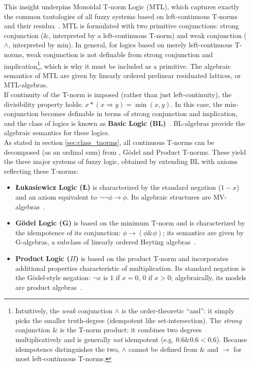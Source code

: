 This insight underpins Monoidal T-norm Logic (MTL), which captures exactly the common tautologies of all fuzzy systems based on left-continuous T-norms and their residua~\cite{GodoMonoidal}. MTL is formulated with two primitive conjunctions: strong conjunction ($\&$, interpreted by a left-continuous T-norm) and weak conjunction ($\wedge$, interpreted by min). In general, for logics based on merely left-continuous T-norms, weak conjunction is not definable from strong conjunction and implication\footnote{Intuitively, the \emph{weak} conjunction $\wedge$ is the order-theoretic ``and'': it simply picks the smaller truth-degree (idempotent like set-intersection). The \emph{strong} conjunction $\&$ is the T-norm product: it combines two degrees multiplicatively and is generally \emph{not} idempotent (e.g. $0.6\&0.6<0.6$). Because idempotence distinguishes the two, $\wedge$ cannot be defined from $\&$ and $\to$ for most left-continuous T-norms.}, which is why it must be included as a primitive. The algebraic semantics of MTL are given by linearly ordered prelinear residuated lattices, or MTL-algebras.\\

If continuity of the T-norm is imposed (rather than just left-continuity), the divisibility property holds: $x * (x \Rightarrow y) = \min(x, y)$. In this case, the min-conjunction becomes definable in terms of strong conjunction and implication, and the class of logics is known as \textbf{Basic Logic (BL)}~\cite[Sec. 2.2]{Hajek1998}. BL-algebras provide the algebraic semantics for these logics.\\ 

As stated in section \ref{sec:class_tnorms}, all continuous T-norms can be decomposed (as an ordinal sum) from \luka, Gödel and Product T-norms. These yield the three major systems of fuzzy logic, obtained by extending BL with axioms reflecting these T-norms:
\begin{itemize}
    \item \textbf{Łukasiewicz Logic (\L)} is characterized by the standard negation ($1-x$) and an axiom equivalent to $\lnot\lnot\phi \rightarrow \phi$. Its algebraic structures are MV-algebras~\cite[Ch. 3]{Hajek1998}.
    \item \textbf{Gödel Logic (G)} is based on the minimum T-norm and is characterized by the idempotence of its conjunction: $\phi \rightarrow (\phi \& \phi)$; its semantics are given by G-algebras, a subclass of linearly ordered Heyting algebras~\cite[Sec. 4.2]{Hajek1998}.
    \item \textbf{Product Logic ($\Pi$)} is based on the product T-norm and incorporates additional properties characteristic of multiplication. Its standard negation is the Gödel-style negation: $\lnot x$ is $1$ if $x=0$, $0$ if $x>0$; algebraically, its models are product algebras~\cite[Sec. 4.1]{Hajek1998}.
\end{itemize}

